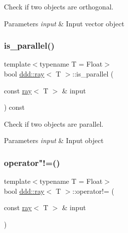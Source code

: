 Check if two objects are orthogonal. 


\begin{DoxyParams}{Parameters}
{\em input} & Input vector object \\
\hline
\end{DoxyParams}
\mbox{\label{classddd_1_1ray_ac17fe4f977e57135cff60d1b152fafb9}} 
\subsubsection{\texorpdfstring{is\+\_\+parallel()}{is\_parallel()}}
{\footnotesize\ttfamily template$<$typename T = Float$>$ \\
bool \hyperlink{classddd_1_1ray}{ddd\+::ray}$<$ T $>$\+::is\+\_\+parallel (\begin{DoxyParamCaption}\item[{const \hyperlink{classddd_1_1ray}{ray}$<$ T $>$ \&}]{input }\end{DoxyParamCaption}) const\hspace{0.3cm}{\ttfamily [inline]}}



Check if two objects are parallel. 


\begin{DoxyParams}{Parameters}
{\em input} & Input object \\
\hline
\end{DoxyParams}
\mbox{\label{classddd_1_1ray_a8b119ad8700dddcff3fcdc45673456a4}} 
\subsubsection{\texorpdfstring{operator"!=()}{operator!=()}}
{\footnotesize\ttfamily template$<$typename T = Float$>$ \\
bool \hyperlink{classddd_1_1ray}{ddd\+::ray}$<$ T $>$\+::operator!= (\begin{DoxyParamCaption}\item[{const \hyperlink{classddd_1_1ray}{ray}$<$ T $>$ \&}]{input }\end{DoxyParamCaption})\hspace{0.3cm}{\ttfamily [inline]}}



